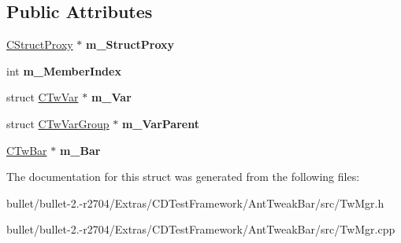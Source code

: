\subsection*{Public Attributes}
\begin{DoxyCompactItemize}
\item 
\hypertarget{struct_c_tw_mgr_1_1_c_member_proxy_a2bd6aadfeb8ccc98d3acc676dd15dc88}{\hyperlink{struct_c_tw_mgr_1_1_c_struct_proxy}{C\+Struct\+Proxy} $\ast$ {\bfseries m\+\_\+\+Struct\+Proxy}}\label{struct_c_tw_mgr_1_1_c_member_proxy_a2bd6aadfeb8ccc98d3acc676dd15dc88}

\item 
\hypertarget{struct_c_tw_mgr_1_1_c_member_proxy_a9b412a70c3f4c2095786321d538e1531}{int {\bfseries m\+\_\+\+Member\+Index}}\label{struct_c_tw_mgr_1_1_c_member_proxy_a9b412a70c3f4c2095786321d538e1531}

\item 
\hypertarget{struct_c_tw_mgr_1_1_c_member_proxy_afadd4bdfe1662f2a8764cd5205280992}{struct \hyperlink{struct_c_tw_var}{C\+Tw\+Var} $\ast$ {\bfseries m\+\_\+\+Var}}\label{struct_c_tw_mgr_1_1_c_member_proxy_afadd4bdfe1662f2a8764cd5205280992}

\item 
\hypertarget{struct_c_tw_mgr_1_1_c_member_proxy_a1319f125e89006bab35ec044012a2ee4}{struct \hyperlink{struct_c_tw_var_group}{C\+Tw\+Var\+Group} $\ast$ {\bfseries m\+\_\+\+Var\+Parent}}\label{struct_c_tw_mgr_1_1_c_member_proxy_a1319f125e89006bab35ec044012a2ee4}

\item 
\hypertarget{struct_c_tw_mgr_1_1_c_member_proxy_a8d37197ee52bdf2610b0496d30d1dedc}{\hyperlink{struct_c_tw_bar}{C\+Tw\+Bar} $\ast$ {\bfseries m\+\_\+\+Bar}}\label{struct_c_tw_mgr_1_1_c_member_proxy_a8d37197ee52bdf2610b0496d30d1dedc}

\end{DoxyCompactItemize}


The documentation for this struct was generated from the following files\+:\begin{DoxyCompactItemize}
\item 
bullet/bullet-\/2.-\/r2704/\+Extras/\+C\+D\+Test\+Framework/\+Ant\+Tweak\+Bar/src/Tw\+Mgr.\+h\item 
bullet/bullet-\/2.-\/r2704/\+Extras/\+C\+D\+Test\+Framework/\+Ant\+Tweak\+Bar/src/Tw\+Mgr.\+cpp\end{DoxyCompactItemize}
